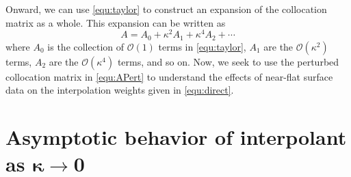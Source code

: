 \documentclass[a4paper,11pt]{article}
\newcommand{\bigO}{\mathcal{O}}
\begin{document}
Onward, we can use \eqref{equ:taylor} to construct an expansion of the collocation matrix as a whole. This expansion can be written as
\begin{equation}
	A = A_0 + \kappa^2 A_1 + \kappa^4 A_2 + \cdots \label{equ:APert}
\end{equation}
where $ A_0 $ is the collection of $ \bigO(1) $ terms in \eqref{equ:taylor}, $ A_1 $ are the $ \bigO(\kappa^2) $ terms, $ A_2 $ are the $ \bigO(\kappa^4) $ terms, and so on. Now, we seek to use the perturbed collocation matrix in \eqref{equ:APert} to understand the effects of near-flat surface data on the interpolation weights given in \eqref{equ:direct}.

\section{Asymptotic behavior of interpolant as $ \pmb{\kappa \to 0} $}

\newpage









































\newpage
\end{document}

